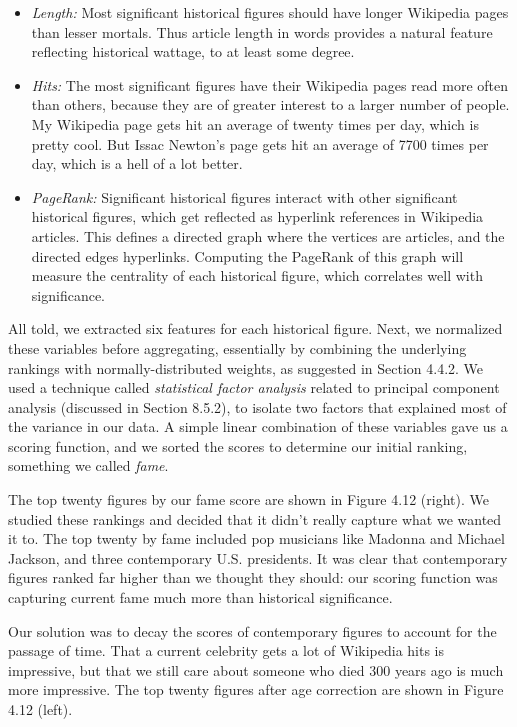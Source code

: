 \documentclass[10pt]{article}
\begin{document}
\begin{itemize}
  \item \emph{Length:} Most significant historical figures should have longer Wikipedia pages than lesser mortals. Thus article length in words provides a natural feature reflecting historical wattage, to at least some degree.
  \item \emph{Hits:} The most significant figures have their Wikipedia pages read more often than others, because they are of greater interest to a larger number of people. My Wikipedia page gets hit an average of twenty times per day, which is pretty cool. But Issac Newton's page gets hit an average of 7700 times per day, which is a hell of a lot better.
  \item \emph{PageRank:} Significant historical figures interact with other significant historical figures, which get reflected as hyperlink references in Wikipedia articles. This defines a directed graph where the vertices are articles, and the directed edges hyperlinks. Computing the PageRank of this graph will measure the centrality of each historical figure, which correlates well with significance.
\end{itemize}

All told, we extracted six features for each historical figure. Next, we normalized these variables before aggregating, essentially by combining the underlying rankings with normally-distributed weights, as suggested in Section 4.4.2. We used a technique called \emph{statistical factor analysis} related to principal component analysis (discussed in Section 8.5.2), to isolate two factors that explained most of the variance in our data. A simple linear combination of these variables gave us a scoring function, and we sorted the scores to determine our initial ranking, something we called \emph{fame}.

The top twenty figures by our fame score are shown in Figure 4.12 (right). We studied these rankings and decided that it didn't really capture what we wanted it to. The top twenty by fame included pop musicians like Madonna and Michael Jackson, and three contemporary U.S. presidents. It was clear that contemporary figures ranked far higher than we thought they should: our scoring function was capturing current fame much more than historical significance.

Our solution was to decay the scores of contemporary figures to account for the passage of time. That a current celebrity gets a lot of Wikipedia hits is impressive, but that we still care about someone who died 300 years ago is much more impressive. The top twenty figures after age correction are shown in Figure 4.12 (left).
\end{document}
